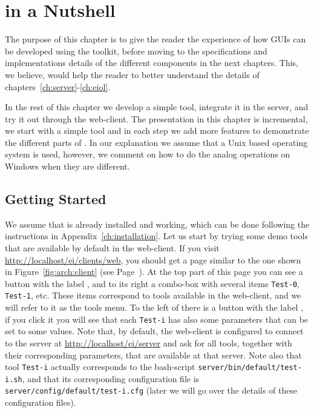 {%
}

\chapter{\ei in a Nutshell}
\label{ch:quickguide}


The purpose of this chapter is to give the reader the experience of
how GUIs can be developed using the \ei toolkit, before moving to the
specifications and implementations details of the different components
in the next chapters.
%
This, we believe, would help the reader to better understand the
details of chapters~\ref{ch:server}-\ref{ch:eiol}.

In the rest of this chapter we develop a simple tool, integrate it in
the \ei server, and try it out through the web-client.
%
The presentation in this chapter is incremental, we start with a
simple tool and in each step we add more features to demonstrate the
different parts of \ei.
%
In our explanation we assume that a Unix based operating system is
used, however, we comment on how to do the analog operations on
Windows when they are different.
%

%

\section{Getting Started}


We assume that \ei is already installed and working, which can be done
following the instructions in Appendix~\ref{ch:installation}.
%
Let us start by trying some demo tools that are available by
default in the web-client.
%
If you visit \url{http://localhost/ei/clients/web}, you should get a
page similar to the one shown in Figure~\ref{fig:arch:client} (see
Page~\pageref{fig:arch:client}).
%
At the top part of this page you can see a button with the label
\applybutton, and to its right a combo-box with several items
\texttt{Test-0}, \texttt{Test-1}, etc. These items correspond to
tools available in the web-client, and we will refer to it as
the tools menu.
%
To the left of \applybutton there is a button with the label
\settingbutton, if you click it you will see that each \texttt{Test-i}
has also some parameters that can be set to some values.
%
Note that, by default, the web-client is configured to connect to the
\ei server at \url{http://localhost/ei/server} and ask for all
tools, together with their corresponding parameters, that are
available at that server.
%
Note also that tool \texttt{Test-i} actually corresponds to the
bash-script \texttt{server/bin/default/test-i.sh}, and that its
corresponding configuration file is
\texttt{server/config/default/test-i.cfg} (later we will go over the
details of these configuration files).
%

